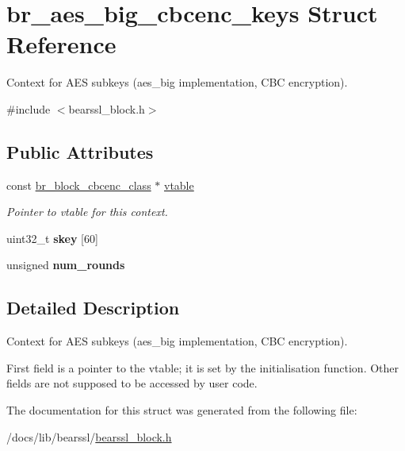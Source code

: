 \hypertarget{structbr__aes__big__cbcenc__keys}{}\section{br\+\_\+aes\+\_\+big\+\_\+cbcenc\+\_\+keys Struct Reference}
\label{structbr__aes__big__cbcenc__keys}


Context for A\+ES subkeys ({\ttfamily aes\+\_\+big} implementation, C\+BC encryption).  




{\ttfamily \#include $<$bearssl\+\_\+block.\+h$>$}

\subsection*{Public Attributes}
\begin{DoxyCompactItemize}
\item 
\mbox{\label{structbr__aes__big__cbcenc__keys_a023975990031eb88a4fe60c998cf9d9f}} 
const \hyperlink{bearssl__block_8h_ad0ecff523e21a74dc1143dcfa52aa251}{br\+\_\+block\+\_\+cbcenc\+\_\+class} $\ast$ \hyperlink{structbr__aes__big__cbcenc__keys_a023975990031eb88a4fe60c998cf9d9f}{vtable}
\begin{DoxyCompactList}\small\item\em Pointer to vtable for this context. \end{DoxyCompactList}\item 
\mbox{\label{structbr__aes__big__cbcenc__keys_a70d67f8be537c74fa2f716059abe9bd2}} 
uint32\+\_\+t {\bfseries skey} \mbox{[}60\mbox{]}
\item 
\mbox{\label{structbr__aes__big__cbcenc__keys_a9004df1554f202c7063fbbdb032f8f77}} 
unsigned {\bfseries num\+\_\+rounds}
\end{DoxyCompactItemize}


\subsection{Detailed Description}
Context for A\+ES subkeys ({\ttfamily aes\+\_\+big} implementation, C\+BC encryption). 

First field is a pointer to the vtable; it is set by the initialisation function. Other fields are not supposed to be accessed by user code. 

The documentation for this struct was generated from the following file\+:\begin{DoxyCompactItemize}
\item 
/docs/lib/bearssl/\hyperlink{bearssl__block_8h}{bearssl\+\_\+block.\+h}\end{DoxyCompactItemize}
